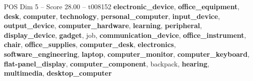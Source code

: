\begin{textsample}{POS Dim 5 – Score 28.00 – t008152}  \label{ex:f5_pos_026}
\textbf{electronic\_device}, \textbf{office\_equipment}, \textbf{desk}, \textbf{computer}, \textbf{technology}, \textbf{personal\_computer}, \textbf{input\_device}, \textbf{output\_device}, \textbf{computer\_hardware}, \textbf{learning}, \textbf{peripheral}, \textbf{display\_device}, \textbf{gadget}, job, \textbf{communication\_device}, \textbf{office\_instrument}, \textbf{chair}, \textbf{office\_supplies}, \textbf{computer\_desk}, \textbf{electronics}, \textbf{software\_engineering}, \textbf{laptop}, \textbf{computer\_monitor}, \textbf{computer\_keyboard}, \textbf{flat-panel\_display}, \textbf{computer\_component}, backpack, \textbf{hearing}, \textbf{multimedia}, \textbf{desktop\_computer}

\end{textsample}
